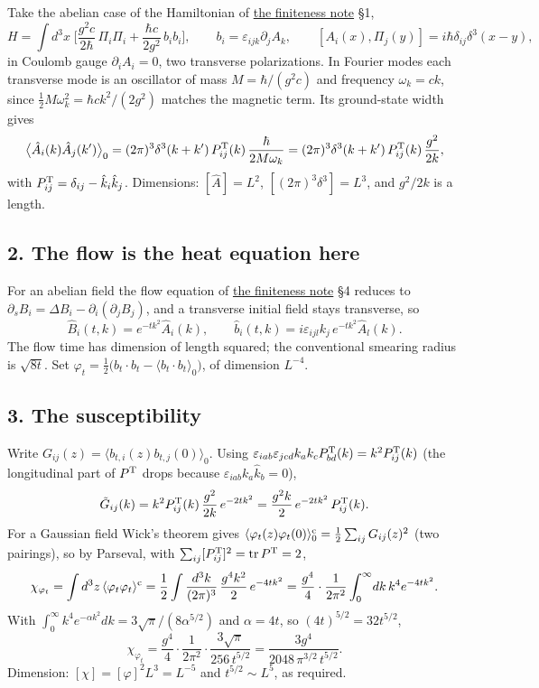 \documentclass[11pt,a4paper]{article}
\begin{document}
Take the abelian case of the Hamiltonian of
\href{finiteness-half-flowed-susceptibility.md}{the finiteness note} §1,
\[H=\int d^3x\;\Big[\frac{g^2c}{2\hbar}\,\Pi_i\Pi_i+\frac{\hbar c}{2g^2}\,b_ib_i\Big],
\qquad b_i=\varepsilon_{ijk}\partial_jA_k,
\qquad[A_i(x),\Pi_j(y)]=i\hbar\delta_{ij}\delta^3(x-y),\] in Coulomb
gauge \(\partial_iA_i=0\), two transverse polarizations. In Fourier
modes each transverse mode is an oscillator of mass \(M=\hbar/(g^2c)\)
and frequency \(\omega_k=ck\), since
\(\tfrac12M\omega_k^2=\hbar ck^2/(2g^2)\) matches the magnetic term. Its
ground-state width gives
\[\big\langle\hat A_i(k)\hat A_j(k')\big\rangle_0=(2\pi)^3\delta^3(k+k')\,P^{\rm T}_{ij}(k)\,\frac{\hbar}{2M\omega_k}
=(2\pi)^3\delta^3(k+k')\,P^{\rm T}_{ij}(k)\,\frac{g^2}{2k},\] with
\(P^{\rm T}_{ij}=\delta_{ij}-\hat k_i\hat k_j\). Dimensions:
\([\hat A]=L^2\), \([(2\pi)^3\delta^3]=L^3\), and \(g^2/2k\) is a
length.

\hypertarget{the-flow-is-the-heat-equation-here}{%
\subsection{2. The flow is the heat equation
here}\label{the-flow-is-the-heat-equation-here}}

For an abelian field the flow equation of
\href{finiteness-half-flowed-susceptibility.md}{the finiteness note} §4
reduces to \(\partial_sB_i=\Delta B_i-\partial_i(\partial_jB_j)\), and a
transverse initial field stays transverse, so
\[\hat B_i(t,k)=e^{-tk^2}\hat A_i(k),\qquad
\hat b_i(t,k)=i\varepsilon_{ijl}k_j\,e^{-tk^2}\hat A_l(k).\] The flow
time has dimension of length squared; the conventional smearing radius
is \(\sqrt{8t}\). Set
\(\varphi_t=\tfrac12\big(b_t\!\cdot\!b_t-\langle b_t\!\cdot\!b_t\rangle_0\big)\),
of dimension \(L^{-4}\).

\hypertarget{the-susceptibility}{%
\subsection{3. The susceptibility}\label{the-susceptibility}}

Write \(G_{ij}(z)=\langle b_{t,i}(z)b_{t,j}(0)\rangle_0\). Using
\(\varepsilon_{iab}\varepsilon_{jcd}k_ak_cP^{\rm T}_{bd}(k)=k^2P^{\rm T}_{ij}(k)\)
(the longitudinal part of \(P^{\rm T}\) drops because
\(\varepsilon_{iab}k_a\hat k_b=0\)),
\[\tilde G_{ij}(k)=k^2P^{\rm T}_{ij}(k)\,\frac{g^2}{2k}\,e^{-2tk^2}
=\frac{g^2k}{2}\,e^{-2tk^2}\,P^{\rm T}_{ij}(k).\] For a Gaussian field
Wick's theorem gives
\(\langle\varphi_t(z)\varphi_t(0)\rangle^{\rm c}_0=\tfrac12\sum_{ij}G_{ij}(z)^2\)
(two pairings), so by Parseval, with
\(\sum_{ij}[P^{\rm T}_{ij}]^2=\operatorname{tr}P^{\rm T}=2\),
\[\chi_{\varphi_t}=\int d^3z\,\langle\varphi_t\varphi_t\rangle^{\rm c}
=\frac12\int\frac{d^3k}{(2\pi)^3}\,\frac{g^4k^2}{2}\,e^{-4tk^2}
=\frac{g^4}{4}\cdot\frac1{2\pi^2}\int_0^\infty\!dk\,k^4e^{-4tk^2}.\]
With \(\int_0^\infty k^4e^{-\alpha k^2}dk=3\sqrt\pi/(8\alpha^{5/2})\)
and \(\alpha=4t\), so \((4t)^{5/2}=32t^{5/2}\),
\[\chi_{\varphi_t}=\frac{g^4}{4}\cdot\frac1{2\pi^2}\cdot\frac{3\sqrt\pi}{256\,t^{5/2}}
=\frac{3g^4}{2048\,\pi^{3/2}\,t^{5/2}} .\] Dimension:
\([\chi]=[\varphi]^2L^3=L^{-5}\) and \(t^{5/2}\sim L^5\), as required.
\end{document}

